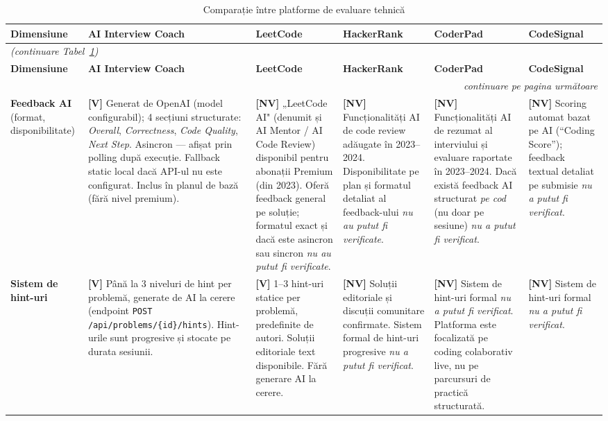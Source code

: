 \begin{longtable}{p{2.4cm}|p{3.0cm}|p{3.0cm}|p{3.0cm}|p{3.0cm}|p{3.0cm}}
\caption{Comparație între platforme de evaluare tehnică}
\label{tab:comparatie} \\

\hline
\textbf{Dimensiune} &
\textbf{AI Interview Coach} &
\textbf{LeetCode} &
\textbf{HackerRank} &
\textbf{CoderPad} &
\textbf{CodeSignal} \\
\hline
\endfirsthead

\multicolumn{6}{l}{\small\textit{(continuare Tabel~\ref{tab:comparatie})}} \\
\hline
\textbf{Dimensiune} &
\textbf{AI Interview Coach} &
\textbf{LeetCode} &
\textbf{HackerRank} &
\textbf{CoderPad} &
\textbf{CodeSignal} \\
\hline
\endhead

\hline
\multicolumn{6}{r}{\small\textit{continuare pe pagina următoare}} \\
\endfoot

\hline
\endlastfoot

\textbf{Feedback AI}
  (format, disponibilitate)
&
  \textbf{[V]}
  Generat de OpenAI (model configurabil);
  4 secțiuni structurate: \emph{Overall}, \emph{Correctness},
  \emph{Code Quality}, \emph{Next Step}.
  Asincron — afișat prin polling după execuție.
  Fallback static local dacă API-ul nu este configurat.
  Inclus în planul de bază (fără nivel premium).
&
  \textbf{[NV]}
  „LeetCode AI" (denumit și AI Mentor / AI Code Review)
  disponibil pentru abonații Premium (din 2023).
  Oferă feedback general pe soluție;
  formatul exact și dacă este asincron sau sincron
  \emph{nu au putut fi verificate}.
&
  \textbf{[NV]}
  Funcționalități AI de code review adăugate în 2023--2024.
  Disponibilitate pe plan și formatul detaliat al
  feedback-ului \emph{nu au putut fi verificate}.
&
  \textbf{[NV]}
  Funcționalități AI de rezumat al interviului și evaluare
  raportate în 2023--2024.
  Dacă există feedback AI structurat \emph{pe cod}
  (nu doar pe sesiune) \emph{nu a putut fi verificat}.
&
  \textbf{[NV]}
  Scoring automat bazat pe AI (``Coding Score'');
  feedback textual detaliat pe submisie
  \emph{nu a putut fi verificat}.
\\
\hline

\textbf{Sistem de hint-uri}
&
  \textbf{[V]}
  Până la 3 niveluri de hint per problemă,
  generate de AI la cerere (endpoint
  \texttt{POST /api/problems/\{id\}/hints}).
  Hint-urile sunt progresive și stocate pe durata sesiunii.
&
  \textbf{[V]}
  1--3 hint-uri statice per problemă, predefinite de autori.
  Soluții editoriale text disponibile.
  Fără generare AI la cerere.
&
  \textbf{[NV]}
  Soluții editoriale și discuții comunitare confirmate.
  Sistem formal de hint-uri progresive
  \emph{nu a putut fi verificat}.
&
  \textbf{[NV]}
  Sistem de hint-uri formal
  \emph{nu a putut fi verificat}.
  Platforma este focalizată pe coding colaborativ live,
  nu pe parcursuri de practică structurată.
&
  \textbf{[NV]}
  Sistem de hint-uri formal
  \emph{nu a putut fi verificat}.
\\
\hline


\end{longtable}
